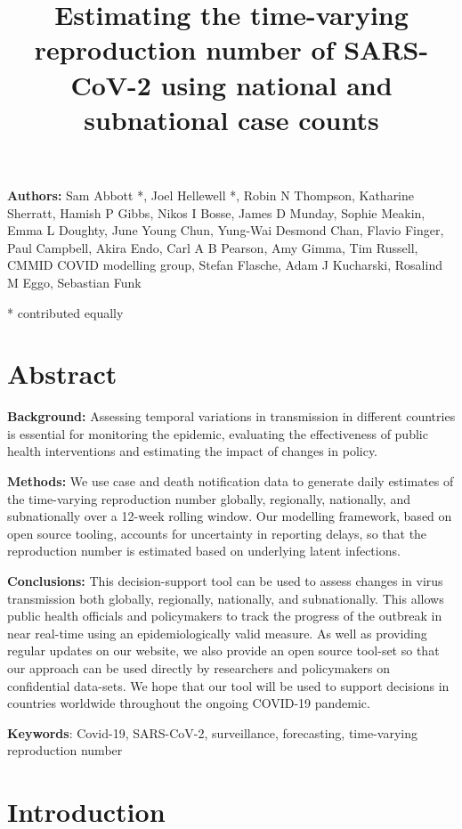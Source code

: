 \documentclass[
]{article}
\title{Estimating the time-varying reproduction number of SARS-CoV-2 using
national and subnational case counts}
\author{}
\date{\vspace{-2.5em}}
\begin{document}
\maketitle

\textbf{Authors:} Sam Abbott *, Joel Hellewell *, Robin N Thompson,
Katharine Sherratt, Hamish P Gibbs, Nikos I Bosse, James D Munday,
Sophie Meakin, Emma L Doughty, June Young Chun, Yung-Wai Desmond Chan,
Flavio Finger, Paul Campbell, Akira Endo, Carl A B Pearson, Amy Gimma,
Tim Russell, CMMID COVID modelling group, Stefan Flasche, Adam J
Kucharski, Rosalind M Eggo, Sebastian Funk

* contributed equally

\hypertarget{abstract}{%
\section{Abstract}\label{abstract}}

\textbf{Background:} Assessing temporal variations in transmission in
different countries is essential for monitoring the epidemic, evaluating
the effectiveness of public health interventions and estimating the
impact of changes in policy.

\textbf{Methods:} We use case and death notification data to generate
daily estimates of the time-varying reproduction number globally,
regionally, nationally, and subnationally over a 12-week rolling window.
Our modelling framework, based on open source tooling, accounts for
uncertainty in reporting delays, so that the reproduction number is
estimated based on underlying latent infections.

\textbf{Conclusions:} This decision-support tool can be used to assess
changes in virus transmission both globally, regionally, nationally, and
subnationally. This allows public health officials and policymakers to
track the progress of the outbreak in near real-time using an
epidemiologically valid measure. As well as providing regular updates on
our website, we also provide an open source tool-set so that our
approach can be used directly by researchers and policymakers on
confidential data-sets. We hope that our tool will be used to support
decisions in countries worldwide throughout the ongoing COVID-19
pandemic.

\textbf{Keywords}: Covid-19, SARS-CoV-2, surveillance, forecasting,
time-varying reproduction number

\hypertarget{introduction}{%
\section{Introduction}\label{introduction}}
\end{document}
